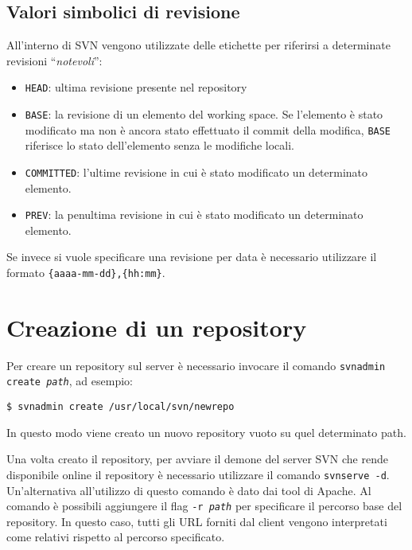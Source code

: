 \subsection{Valori simbolici di revisione}

All'interno di SVN vengono utilizzate delle etichette per riferirsi a determinate revisioni ``\textit{notevoli}'':

\begin{itemize}
	\item \texttt{HEAD}: ultima revisione presente nel repository
	\item \texttt{BASE}: la revisione di un elemento del working space. Se l'elemento è stato modificato ma non è ancora stato effettuato il commit della modifica, \texttt{BASE} riferisce lo stato dell'elemento senza le modifiche locali.
	\item \texttt{COMMITTED}: l'ultime revisione in cui è stato modificato un determinato elemento.
	\item \texttt{PREV}: la penultima revisione in cui è stato modificato un determinato elemento.
\end{itemize}

Se invece si vuole specificare una revisione per data è necessario utilizzare il formato \texttt{\{aaaa-mm-dd\},\{hh:mm\}}.

\section{Creazione di un repository}

Per creare un repository sul server  è necessario invocare il comando \texttt{svnadmin create \textit{path}}, ad esempio:

\begin{lstlisting}
$ svnadmin create /usr/local/svn/newrepo
\end{lstlisting}

In questo modo viene creato un nuovo repository vuoto su quel determinato path.

Una volta creato il repository, per avviare il demone del server SVN che rende disponibile online il repository è necessario utilizzare il comando \texttt{svnserve -d}. Un'alternativa all'utilizzo di questo comando è dato dai tool di Apache.
Al comando è possibili aggiungere il flag \texttt{-r \textit{path}} per specificare il percorso base del repository. In questo caso, tutti gli URL forniti dal client vengono interpretati come relativi rispetto al percorso specificato.

